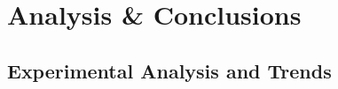 
\chapter{Analysis \& Conclusions} %

\label{AnalysisConclusions} %


\section{Experimental Analysis and Trends}

